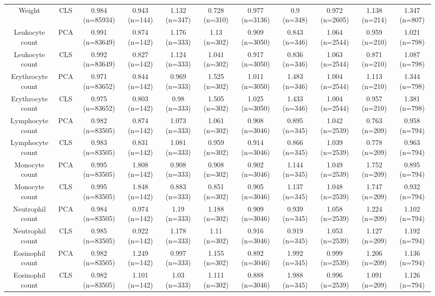 \begin{landscape}
\begin{table}[!htbp]
\begin{tabular}{ ccccccccccc}
Weight & CLS & 0.984 (n=85934) & 0.943 (n=144) & 1.132 (n=347) & 0.728 (n=310) & 0.977 (n=3136) & 0.9 (n=348) & 0.972 (n=2605) & 1.138 (n=214) & 1.347 (n=807) \\ 
Leukocyte count & PCA & 0.991 (n=83649) & 0.874 (n=142) & 1.176 (n=333) & 1.13 (n=302) & 0.909 (n=3050) & 0.843 (n=346) & 1.064 (n=2544) & 0.959 (n=210) & 1.021 (n=798) \\ 
Leukocyte count & CLS & 0.992 (n=83649) & 0.827 (n=142) & 1.124 (n=333) & 1.041 (n=302) & 0.917 (n=3050) & 0.836 (n=346) & 1.063 (n=2544) & 0.871 (n=210) & 1.087 (n=798) \\ 
Erythrocyte count & PCA & 0.971 (n=83652) & 0.844 (n=142) & 0.969 (n=333) & 1.525 (n=302) & 1.011 (n=3050) & 1.483 (n=346) & 1.004 (n=2544) & 1.113 (n=210) & 1.344 (n=798) \\ 
Erythrocyte count & CLS & 0.975 (n=83652) & 0.803 (n=142) & 0.98 (n=333) & 1.505 (n=302) & 1.025 (n=3050) & 1.433 (n=346) & 1.004 (n=2544) & 0.957 (n=210) & 1.381 (n=798) \\ 
Lymphocyte count & PCA & 0.982 (n=83505) & 0.874 (n=142) & 1.073 (n=333) & 1.061 (n=302) & 0.908 (n=3046) & 0.895 (n=345) & 1.042 (n=2539) & 0.763 (n=209) & 0.958 (n=794) \\ 
Lymphocyte count & CLS & 0.983 (n=83505) & 0.831 (n=142) & 1.081 (n=333) & 0.959 (n=302) & 0.914 (n=3046) & 0.866 (n=345) & 1.039 (n=2539) & 0.778 (n=209) & 0.963 (n=794) \\ 
Monocyte count & PCA & 0.995 (n=83505) & 1.808 (n=142) & 0.908 (n=333) & 0.908 (n=302) & 0.902 (n=3046) & 1.144 (n=345) & 1.049 (n=2539) & 1.752 (n=209) & 0.895 (n=794) \\ 
Monocyte count & CLS & 0.995 (n=83505) & 1.848 (n=142) & 0.883 (n=333) & 0.851 (n=302) & 0.905 (n=3046) & 1.137 (n=345) & 1.048 (n=2539) & 1.747 (n=209) & 0.932 (n=794) \\ 
Neutrophil count & PCA & 0.984 (n=83505) & 0.974 (n=142) & 1.19 (n=333) & 1.188 (n=302) & 0.909 (n=3046) & 0.939 (n=345) & 1.058 (n=2539) & 1.224 (n=209) & 1.102 (n=794) \\ 
Neutrophil count & CLS & 0.985 (n=83505) & 0.922 (n=142) & 1.178 (n=333) & 1.11 (n=302) & 0.916 (n=3046) & 0.919 (n=345) & 1.053 (n=2539) & 1.127 (n=209) & 1.192 (n=794) \\ 
Eosinophil count & PCA & 0.982 (n=83505) & 1.249 (n=142) & 0.997 (n=333) & 1.155 (n=302) & 0.892 (n=3046) & 1.992 (n=345) & 0.999 (n=2539) & 1.206 (n=209) & 1.136 (n=794) \\ 
Eosinophil count & CLS & 0.982 (n=83505) & 1.101 (n=142) & 1.03 (n=333) & 1.111 (n=302) & 0.888 (n=3046) & 1.988 (n=345) & 0.996 (n=2539) & 1.091 (n=209) & 1.126 (n=794) \\ 

\end{tabular}
\end{table}
\end{landscape}
